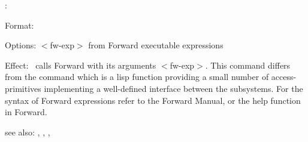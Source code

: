 \colab{} \fw:

Format: 

Options: $<$fw-exp$>$ from Forward executable expressions

Effect: \fw \ calls Forward with its arguments $<$fw-exp$>$.
        This command differs from the command 
        which is a lisp function providing a small number of 
        access-primitives implementing a well-defined interface between
	the \COLAB{} subsystems. For the syntax of Forward expressions
	refer to the Forward Manual, or the help function in Forward.

see also: \col, \rf, \cn, \tx
